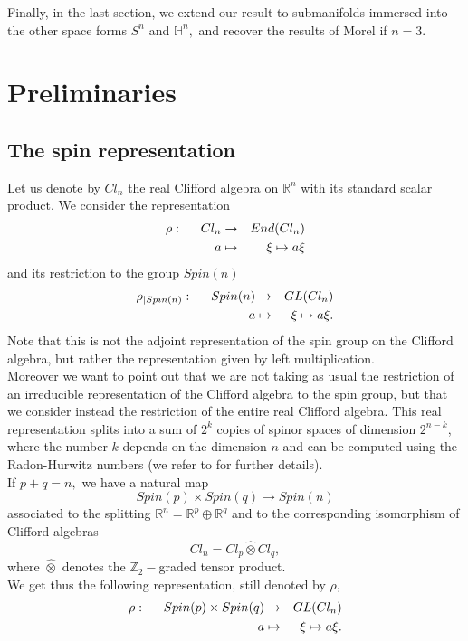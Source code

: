 \documentclass{amsart}
\begin{document}
Finally, in the last section, we extend our result to submanifolds immersed into the other space forms $S^n$ and ${\mathbb{H}}^n,$ and recover the results of Morel \cite{Mo} if $n=3.$ 

\section{Preliminaries}\label{sec preliminaries}
\subsection{The spin representation}
Let us denote by $Cl_n$ the real Clifford algebra on ${\mathbb{R}}^n$ with its standard scalar product. We consider the representation
\begin{eqnarray*}
\rho:\hspace{.5cm} Cl_n&\rightarrow& End(Cl_n)\\
a&\mapsto& \xi\mapsto a\xi
\end{eqnarray*}
and its restriction to the group $Spin(n)$
\begin{eqnarray*}
\rho_{|Spin(n)}:\hspace{.5cm} Spin(n)&\rightarrow& GL(Cl_n)\\
a&\mapsto& \xi\mapsto a\xi.
\end{eqnarray*}
Note that this is not the adjoint representation of the spin group on the Clifford algebra, but rather the representation given by left multiplication.\\ Moreover we want to point out that we are not taking as usual the restriction of an irreducible representation of the Clifford algebra to the spin group, but that we consider instead the restriction of the entire real Clifford algebra. This real representation splits into a sum of  $2^k$ copies of spinor spaces of dimension $2^{n-k}$, where the number $k$ depends on the dimension $n$ and can be computed using the Radon-Hurwitz numbers (we refer to \cite{Lu} for further details). \\
If $p+q=n,$ we have a natural map
$$Spin(p)\times Spin(q)\rightarrow Spin(n)$$
associated to the splitting ${\mathbb{R}}^n={\mathbb{R}}^p\oplus{\mathbb{R}}^q$ and to the corresponding isomorphism of Clifford algebras
$$Cl_n=Cl_p\hat{\otimes} Cl_q,$$
where $\hat{\otimes}$ denotes the ${\mathbb{Z}}_2-$graded tensor product. \\
We get thus the following representation, still denoted by $\rho,$
\begin{eqnarray}
\rho:\hspace{.5cm} Spin(p)\times Spin(q)&\rightarrow& GL(Cl_n)\label{rep spin p spin q}\\
a&\mapsto& \xi\mapsto a\xi.\nonumber
\end{eqnarray}
\end{document}

